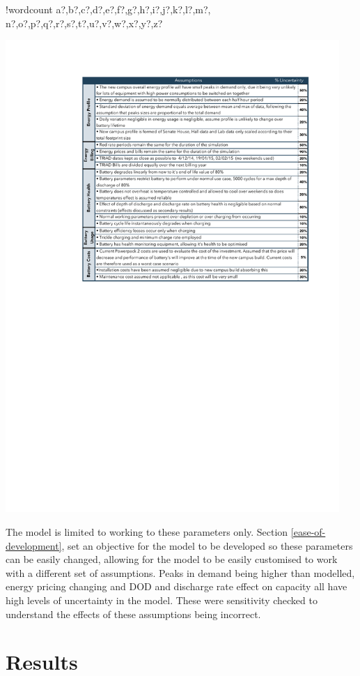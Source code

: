 \documentclass[fontsize=9.5pt]{extarticle}
\numberwithin{figure}{section} %
\newcounter{words}
\newenvironment{counted}{%
  \setcounter{words}{0}
  \SearchList!{wordcount}{\stepcounter{words}}
    {a?,b?,c?,d?,e?,f?,g?,h?,i?,j?,k?,l?,m?,
    n?,o?,p?,q?,r?,s?,t?,u?,v?,w?,x?,y?,z?}
  \UndoBoundary{'}
  \SearchOrder{p;}}{%
  \StopSearching}
\begin{document}
\begin{counted}
\begin{table}[H]
 \vspace{0pt}
  \centering
  \includegraphics[trim = 0 0 0 0, clip, width=0.95\textwidth]{assumpp2.pdf}
  \vspace{-20pt}
  \end{table}

The model is limited to working to these parameters only. Section
\ref{ease-of-development}, set an objective for the model to be
developed so these parameters can be easily changed, allowing for the
model to be easily customised to work with a different set of
assumptions. Peaks in demand being higher than modelled, energy pricing
changing and DOD and discharge rate effect on capacity all have high
levels of uncertainty in the model. These were sensitivity checked to
understand the effects of these assumptions being incorrect.

\section{Results}\label{results}


\end{counted}
\end{document}
